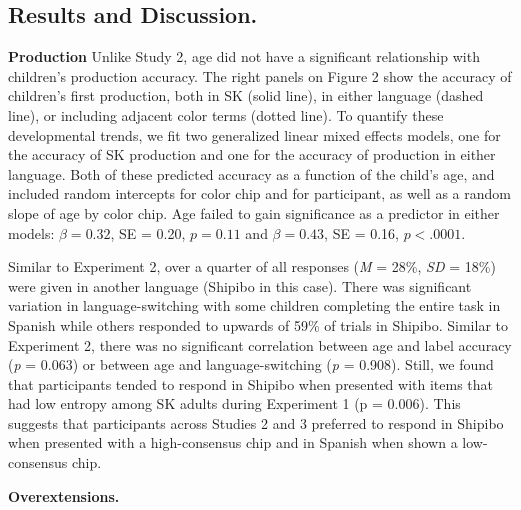 \documentclass[,man,floatsintext]{apa6}
\theoremstyle{definition}
\theoremstyle{definition}
\theoremstyle{definition}
\theoremstyle{remark}
\begin{document}
\subsection{Results and Discussion.}\label{results-and-discussion.}

\textbf{Production} Unlike Study 2, age did not have a significant
relationship with children's production accuracy. The right panels on
Figure 2 show the accuracy of children's first production, both in SK
(solid line), in either language (dashed line), or including adjacent
color terms (dotted line). To quantify these developmental trends, we
fit two generalized linear mixed effects models, one for the accuracy of
SK production and one for the accuracy of production in either language.
Both of these predicted accuracy as a function of the child's age, and
included random intercepts for color chip and for participant, as well
as a random slope of age by color chip. Age failed to gain significance
as a predictor in either models: \(\beta = 0.32\), SE = 0.20,
\(p = 0.11\) and \(\beta = 0.43\), SE = 0.16, \(p < .0001\).

Similar to Experiment 2, over a quarter of all responses (\emph{M} =
28\%, \emph{SD} = 18\%) were given in another language (Shipibo in this
case). There was significant variation in language-switching with some
children completing the entire task in Spanish while others responded to
upwards of 59\% of trials in Shipibo. Similar to Experiment 2, there was
no significant correlation between age and label accuracy (\emph{p} =
0.063) or between age and language-switching (\emph{p} = 0.908). Still,
we found that participants tended to respond in Shipibo when presented
with items that had low entropy among SK adults during Experiment 1 (p =
0.006). This suggests that participants across Studies 2 and 3 preferred
to respond in Shipibo when presented with a high-consensus chip and in
Spanish when shown a low-consensus chip.

\textbf{Overextensions.}
\end{document}
